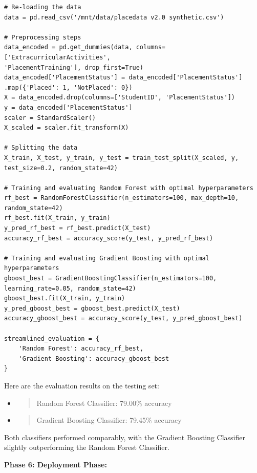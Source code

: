 \documentclass[]{article}
\newcommand{\textcenter}[1]{\begin{center} \vspace{10px}\textbf{\large #1} \end{center}}
\begin{document}
\begin{verbatim}
# Re-loading the data
data = pd.read_csv('/mnt/data/placedata v2.0 synthetic.csv')

# Preprocessing steps
data_encoded = pd.get_dummies(data, columns=['ExtracurricularActivities', 
'PlacementTraining'], drop_first=True)
data_encoded['PlacementStatus'] = data_encoded['PlacementStatus']
.map({'Placed': 1, 'NotPlaced': 0})
X = data_encoded.drop(columns=['StudentID', 'PlacementStatus'])
y = data_encoded['PlacementStatus']
scaler = StandardScaler()
X_scaled = scaler.fit_transform(X)

# Splitting the data
X_train, X_test, y_train, y_test = train_test_split(X_scaled, y, 
test_size=0.2, random_state=42)

# Training and evaluating Random Forest with optimal hyperparameters
rf_best = RandomForestClassifier(n_estimators=100, max_depth=10, random_state=42)
rf_best.fit(X_train, y_train)
y_pred_rf_best = rf_best.predict(X_test)
accuracy_rf_best = accuracy_score(y_test, y_pred_rf_best)

# Training and evaluating Gradient Boosting with optimal hyperparameters
gboost_best = GradientBoostingClassifier(n_estimators=100,
learning_rate=0.05, random_state=42)
gboost_best.fit(X_train, y_train)
y_pred_gboost_best = gboost_best.predict(X_test)
accuracy_gboost_best = accuracy_score(y_test, y_pred_gboost_best)

streamlined_evaluation = {
    'Random Forest': accuracy_rf_best,
    'Gradient Boosting': accuracy_gboost_best
}

\end{verbatim}

Here are the evaluation results on the testing set:

\begin{itemize}
\item
  \begin{quote}
  Random Forest Classifier: 79.00\% accuracy
  \end{quote}
\item
  \begin{quote}
  Gradient Boosting Classifier: 79.45\% accuracy
  \end{quote}
\end{itemize}

Both classifiers performed comparably, with the Gradient Boosting
Classifier slightly outperforming the Random Forest Classifier.

\textcenter{Phase 6: Deployment Phase:}
\end{document}
